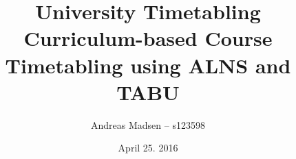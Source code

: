 \documentclass[a4paper]{article}
\numberwithin{equation}{section}
\begin{document}
\title{University Timetabling \\ {\large Curriculum-based Course Timetabling using ALNS and TABU}}
\author{Andreas Madsen – s123598}
\date{April 25. 2016}

\maketitle
\tableofcontents
\pagebreak


\pagebreak
\appendix



\pagebreak
\printbibliography
\end{document}
